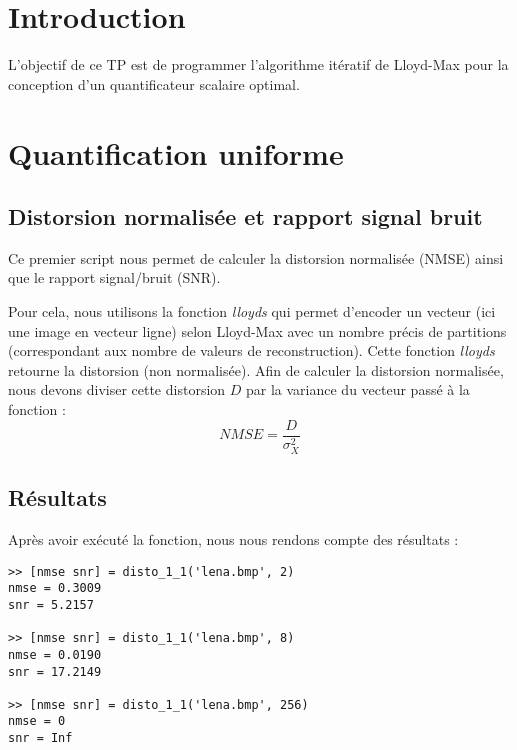 \documentclass[a4paper, 12pt]{article}
\begin{document}






\clearpage

\section{Introduction}
L'objectif de ce TP est de programmer l'algorithme itératif de Lloyd-Max pour la conception d'un quantificateur scalaire optimal.

\section{Quantification uniforme}

\subsection{Distorsion normalisée et rapport signal bruit}

Ce premier script nous permet de calculer la distorsion normalisée (NMSE) ainsi que le rapport signal/bruit (SNR).

Pour cela, nous utilisons la fonction \textit{lloyds} qui permet d'encoder un vecteur (ici une image en vecteur ligne) selon Lloyd-Max avec un nombre précis de partitions (correspondant aux nombre de valeurs de reconstruction). Cette fonction \textit{lloyds} retourne la distorsion (non normalisée). Afin de calculer la distorsion normalisée, nous devons diviser cette distorsion $D$ par la variance du vecteur passé à la fonction :
		\[NMSE = \frac{D}{\sigma_X^2} 
	\]


\subsection{Résultats}

Après avoir exécuté la fonction, nous nous rendons compte des résultats : 

\begin{verbatim}
>> [nmse snr] = disto_1_1('lena.bmp', 2)
nmse = 0.3009
snr = 5.2157

>> [nmse snr] = disto_1_1('lena.bmp', 8)
nmse = 0.0190
snr = 17.2149

>> [nmse snr] = disto_1_1('lena.bmp', 256)
nmse = 0
snr = Inf
\end{verbatim}
\end{document}
